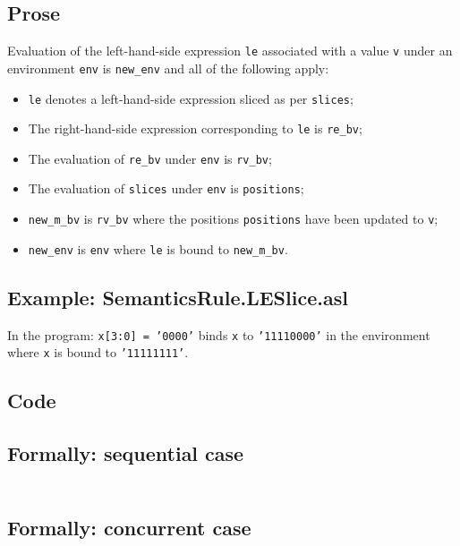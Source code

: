 \documentclass{book}
\begin{document}
    \subsection{Prose}
    Evaluation of the left-hand-side expression \texttt{le} associated with a
value \texttt{v} under an environment \texttt{env} is \texttt{new\_env} and all
of the following apply:
    \begin{itemize}
    \item \texttt{le} denotes a left-hand-side expression sliced as per \texttt{slices};
    \item The right-hand-side expression corresponding to \texttt{le} is \texttt{re\_bv};
    \item The evaluation of \texttt{re\_bv} under \texttt{env} is \texttt{rv\_bv};
    \item The evaluation of \texttt{slices} under \texttt{env} is \texttt{positions};
    \item \texttt{new\_m\_bv} is \texttt{rv\_bv} where the positions \texttt{positions} have been updated to \texttt{v};
    \item \texttt{new\_env} is \texttt{env} where \texttt{le} is bound to \texttt{new\_m\_bv}.
    \end{itemize}

   \subsection{Example: SemanticsRule.LESlice.asl}
   In the program:
   \texttt{x[3:0] = '0000'} binds \texttt{x} to \texttt{'11110000'} in the environment where \texttt{x} is bound to \texttt{'11111111'}.

  \subsection{Code}

  \subsection{Formally: sequential case}
  \begin{align}
  \end{align} 

  \subsection{Formally: concurrent case}
  \begin{align}
  \end{align} 
\end{document}
